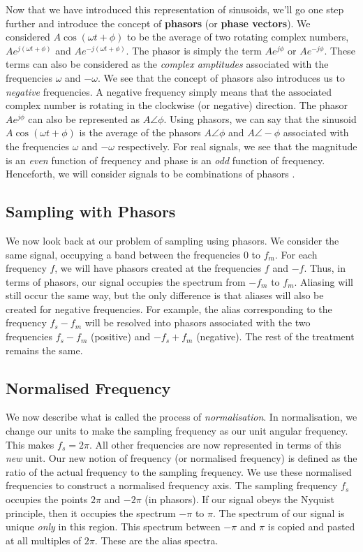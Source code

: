 \documentclass{article}
\theoremstyle{definition}
\begin{document}
		
		Now that we have introduced this representation of sinusoids, we'll go one step further and introduce the concept of \textbf{phasors} (or \textbf{phase vectors}). We considered $A\cos(\omega t + \phi)$ to be the average of two rotating complex numbers, $Ae^{j(\omega t + \phi)}$ and $Ae^{-j(\omega t + \phi)}$. The phasor is simply the term $Ae^{j\phi}$ or $Ae^{-j\phi}$. These terms can also be considered as the \textit{complex amplitudes} associated with the frequencies $\omega$ and $-\omega$. We see that the concept of phasors also introduces us to \textit{negative} frequencies. A negative frequency simply means that the associated complex number is rotating in the clockwise (or negative) direction. The phasor $Ae^{j\phi}$ can also be represented as $A\angle\phi$. Using phasors, we can say that the sinusoid $A\cos(\omega t + \phi)$ is the average of the phasors $A\angle\phi$ and $A\angle -\phi$ associated with the frequencies $\omega$ and $-\omega$ respectively. For real signals, we see that the magnitude is an \textit{even} function of frequency and phase is an \textit{odd} function of frequency. Henceforth, we will consider signals to be combinations of phasors . 
		
		\subsection{Sampling with Phasors}
		
		We now look back at our problem of sampling using phasors. We consider the same signal, occupying a band between the frequencies $0$ to $f_m$. For each frequency $f$, we will have phasors created at the frequencies $f$ and $-f$. Thus, in terms of phasors, our signal occupies the spectrum from $-f_m$ to $f_m$. Aliasing will still occur the same way, but the only difference is that aliases will also be created for negative frequencies. For example, the alias corresponding to the frequency $f_s - f_m$ will be resolved into phasors associated with the two frequencies $f_s - f_m$ (positive) and $-f_s + f_m$ (negative). The rest of the treatment remains the same. 
		
		\subsection{Normalised Frequency}
		
		We now describe what is called the process of \textit{normalisation}. In normalisation, we change our units to make the sampling frequency as our unit angular frequency. This makes $f_s = 2\pi$. All other frequencies are now represented in terms of this \textit{new} unit. Our new notion of frequency (or normalised frequency) is defined as the ratio of the actual frequency to the sampling frequency. We use these normalised frequencies to construct a normalised frequency axis. The sampling frequency $f_s$ occupies the points $2\pi$ and $-2\pi$ (in phasors). If our signal obeys the Nyquist principle, then it occupies the spectrum $-\pi$ to $\pi$. The spectrum of our signal is unique \textit{only} in this region. This spectrum between $-\pi$ and $\pi$ is copied and pasted at all multiples of $2\pi$. These are the alias spectra. \smallskip
		
\end{document}

